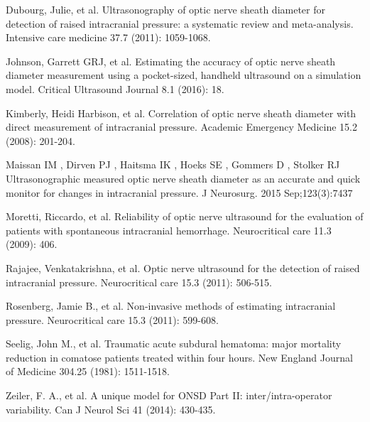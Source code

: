 \documentclass{llncs}
\begin{document}
%
%
\begin{thebibliography}{}
%
Dubourg, Julie, et al. 
Ultrasonography of optic nerve sheath diameter for detection of raised
intracranial pressure: a systematic review and meta-analysis.
Intensive care medicine 37.7 (2011): 1059-1068.



Johnson, Garrett GRJ, et al. 
Estimating the accuracy of optic nerve sheath diameter measurement using a
pocket-sized, handheld ultrasound on a simulation model.  Critical Ultrasound
Journal 8.1 (2016): 18.

Kimberly, Heidi Harbison, et al. 
Correlation of optic nerve sheath diameter with direct measurement of
intracranial pressure.
Academic Emergency Medicine 15.2 (2008): 201-204.

Maissan IM , Dirven PJ , Haitsma IK , Hoeks SE , Gommers D , Stolker RJ 
Ultrasonographic measured optic nerve sheath diameter as an accurate and quick
monitor for changes in intracranial pressure. 
J Neurosurg. 2015 Sep;123(3):7437

Moretti, Riccardo, et al. 
Reliability of optic nerve ultrasound for the evaluation of patients with
spontaneous intracranial hemorrhage.
Neurocritical care 11.3 (2009): 406.

Rajajee, Venkatakrishna, et al. 
Optic nerve ultrasound for the detection of raised intracranial pressure. 
Neurocritical care 15.3 (2011): 506-515.

Rosenberg, Jamie B., et al. 
Non-invasive methods of estimating intracranial pressure.
Neurocritical care 15.3 (2011): 599-608.

Seelig, John M., et al. 
Traumatic acute subdural hematoma: major mortality reduction in comatose
patients treated within four hours.
New England Journal of Medicine 304.25 (1981): 1511-1518.

Zeiler, F. A., et al. 
A unique model for ONSD Part II: inter/intra-operator variability. 
Can J Neurol Sci 41 (2014): 430-435.



\end{thebibliography}
\end{document}
